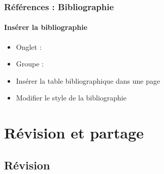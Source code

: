 \documentclass[xcolor=table]{beamer}
\begin{document}
\begin{frame}[t]
\frametitle{Références : Bibliographie}
\framesubtitle{Insérer la bibliographie}

\begin{minipage}{0.38\textwidth}
	\begin{itemize}
		\item Onglet : 
		\item Groupe : 
		\item Insérer la table bibliographique dans une page
		\item Modifier le style de la bibliographie
	\end{itemize}
\end{minipage}
\begin{minipage}{0.35\textwidth}
\end{minipage}
\begin{minipage}{0.25\textwidth}
	\vspace{1cm}
\end{minipage}

\end{frame}

\section{Révision et partage}

%

\subsection{Révision}
\end{document}

